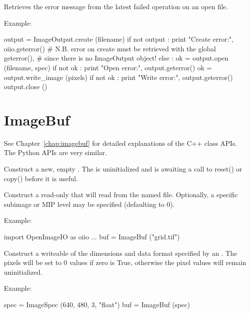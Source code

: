 Retrieves the error message from the latest failed operation on an open
file.

\noindent Example:
\begin{code}
    output = ImageOutput.create (filename)
    if not output :
        print "Create error:", oiio.geterror()
        # N.B. error on create must be retrieved with the global geterror(),
        # since there is no ImageOutput object!
    else :
        ok = output.open (filename, spec)
        if not ok :
            print "Open error:", output.geterror()
        ok = output.write_image (pixels)
        if not ok :
            print "Write error:", output.geterror()
        output.close ()
\end{code}
\apiend



\section{ImageBuf}
\label{sec:pythonimagebuf}

See Chapter~\ref{chap:imagebuf} for detailed explanations of the
C++ \ImageBuf class APIs. The Python APIs are very similar.

Construct a new, empty \ImageBuf. The \ImageBuf is uninitialized and is
awaiting a call to {\cf reset()} or {\cf copy()} before it is useful.
\apiend


Construct a read-only \ImageBuf that will read from the named file.
Optionally, a specific subimage or MIP level may be specified (defaulting to
0).

\noindent Example:
\begin{code}
    import OpenImageIO as oiio
    ...
    buf = ImageBuf ("grid.tif")
\end{code}
\apiend


Construct a writeable \ImageBuf of the dimensions and data format specified
by an \ImageSpec. 
The pixels will be set to 0 values if {\cf zero} is True, otherwise the
pixel values will remain uninitialized.

\noindent Example:
\begin{code}
    spec = ImageSpec (640, 480, 3, "float")
    buf = ImageBuf (spec)
\end{code}
\apiend

